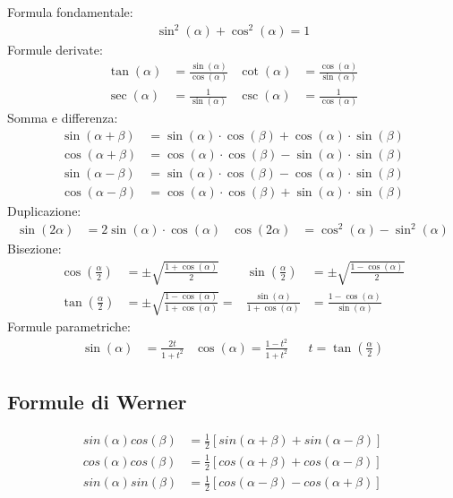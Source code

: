 \documentclass[a4paper]{article}
\begin{document}
	Formula fondamentale:
	\begin{align*}
	\sin ^2 (\alpha) + \cos^2 (\alpha) = 1
	\end{align*}
	Formule derivate:
	\begin{align*}
	\tan (\alpha) & = \frac{\sin (\alpha)}{\cos (\alpha)} & \cot (\alpha) & = \frac{\cos (\alpha)}{\sin (\alpha)} \\
	\sec (\alpha) & = \frac{1}{\sin (\alpha)}             & \csc (\alpha) & = \frac{1}{\cos (\alpha)}
	\end{align*}
	Somma e differenza:
	\begin{align*}
	\sin (\alpha + \beta) & = \sin (\alpha) \cdot \cos (\beta) + \cos (\alpha) \cdot \sin (\beta)\\
	\cos (\alpha + \beta) & = \cos (\alpha) \cdot \cos (\beta) - \sin (\alpha) \cdot \sin (\beta)\\
	\sin (\alpha - \beta) & = \sin (\alpha) \cdot \cos (\beta) - \cos (\alpha) \cdot \sin (\beta)\\
	\cos (\alpha - \beta) & = \cos (\alpha) \cdot \cos (\beta) + \sin (\alpha) \cdot \sin (\beta)
	\end{align*}
	Duplicazione:
	\begin{align*}
	\sin (2 \alpha) & = 2 \sin (\alpha) \cdot \cos (\alpha)	&	\cos (2 \alpha) & = \cos^2 (\alpha) - \sin^2 (\alpha)
	\end{align*}
	Bisezione:
	\begin{align*}
	\cos \left(\frac{\alpha}{2}\right) &= \pm \sqrt{\frac{1 + \cos (\alpha)}{2}} & \sin \left(\frac{\alpha}{2}\right) &= \pm \sqrt{\frac{1 - \cos (\alpha)}{2}}\\
	\tan \left(\frac{\alpha}{2}\right) &= \pm \sqrt{\frac{1-\cos (\alpha)}{1+\cos (\alpha)}} = &\frac{\sin (\alpha)}{1+\cos (\alpha)} &= \frac{1-\cos (\alpha)}{\sin (\alpha)}
	\end{align*}
	Formule parametriche:
	\begin{align*}
	\sin (\alpha) &= \frac{2t}{1+t^2} & \cos (\alpha) = \frac{1 - t^2}{1 + t^2} & & t= \tan \left(\frac{\alpha}{2}\right)
	\end{align*}
	
	\subsection{Formule di Werner}
	\begin{align*}
		sin(\alpha)cos(\beta) &= \frac{1}{2}[sin(\alpha + \beta) + sin(\alpha - \beta)]\\
		cos(\alpha)cos(\beta) &= \frac{1}{2}[cos(\alpha + \beta) + cos(\alpha - \beta)]\\
		sin(\alpha)sin(\beta) &= \frac{1}{2}[cos(\alpha - \beta) - cos(\alpha + \beta)]\\
	\end{align*}
	
\end{document}
